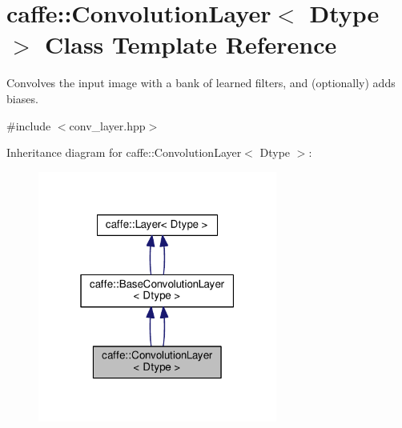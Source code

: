 \hypertarget{classcaffe_1_1_convolution_layer}{}\section{caffe\+:\+:Convolution\+Layer$<$ Dtype $>$ Class Template Reference}
\label{classcaffe_1_1_convolution_layer}


Convolves the input image with a bank of learned filters, and (optionally) adds biases.  




{\ttfamily \#include $<$conv\+\_\+layer.\+hpp$>$}



Inheritance diagram for caffe\+:\+:Convolution\+Layer$<$ Dtype $>$\+:
\nopagebreak
\begin{figure}[H]
\begin{center}
\leavevmode
\includegraphics[width=223pt]{classcaffe_1_1_convolution_layer__inherit__graph}
\end{center}
\end{figure}
